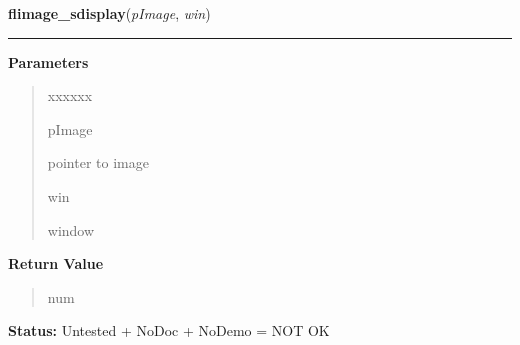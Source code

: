 \hspace{.8\funcindent}\begin{boxedminipage}{\funcwidth}

    \raggedright \textbf{flimage\_sdisplay}(\textit{pImage}, \textit{win})

    \vspace{-1.5ex}

    \rule{\textwidth}{0.5\fboxrule}
\setlength{\parskip}{2ex}
\setlength{\parskip}{1ex}
      \textbf{Parameters}
      \vspace{-1ex}

      \begin{quote}
        \begin{Ventry}{xxxxxx}

          \item[pImage]

          pointer to image

          \item[win]

          window

        \end{Ventry}

      \end{quote}

      \textbf{Return Value}
    \vspace{-1ex}

      \begin{quote}
      num

      \end{quote}

\textbf{Status:} Untested + NoDoc + NoDemo = NOT OK



    \end{boxedminipage}

    \label{xformslib:flflimage:flimage_convert}

    \vspace{0.5ex}

